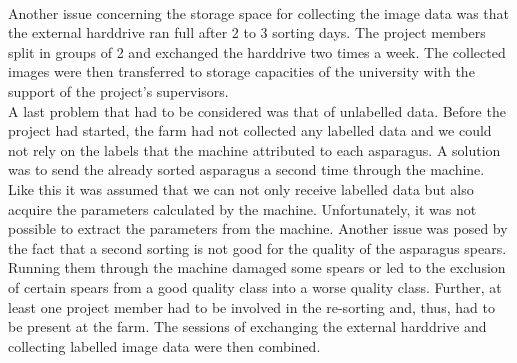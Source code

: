 \\
Another issue concerning the storage space for collecting the image data was that the external harddrive ran full after 2 to 3 sorting days. The project members split in groups of 2 and exchanged the harddrive two times a week. The collected images were then transferred to storage capacities of the university with the support of the project’s supervisors. \\
A last problem that had to be considered was that of unlabelled data. Before the project had started, the farm had not collected any labelled data and we could not rely on the labels that the machine attributed to each asparagus. A solution was to send the already sorted asparagus a second time through the machine. Like this it was assumed that we can not only receive labelled data but also acquire the parameters calculated by the machine. Unfortunately, it was not possible to extract the parameters from the machine. Another issue was posed by the fact that a second sorting is not good for the quality of the asparagus spears. Running them through the machine damaged some spears or led to the exclusion of certain spears from a good quality class into a worse quality class. Further, at least one project member had to be involved in the re-sorting and, thus, had to be present at the farm. The sessions of exchanging the external harddrive and collecting labelled image data were then combined. \\

